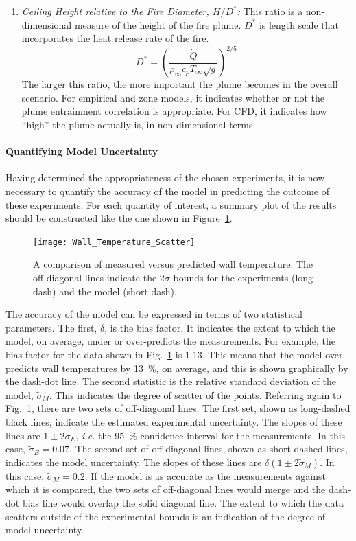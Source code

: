 \documentclass[graybox]{svmult}
\begin{document}
\begin{enumerate}
\item {\em Ceiling Height relative to the Fire Diameter, $H/D^*$:}
This ratio is a non-dimensional measure of the height of the fire plume.
$D^*$ is length scale that incorporates the heat release rate of the fire.
\begin{equation}
   D^* = \left( \frac{\dot{Q}}{\rho_\infty c_p T_\infty \sqrt{g}} \right)^{2/5} \label{Dstar}
\end{equation}
The larger this ratio, the more important the plume becomes in the overall scenario. For empirical and zone models, it indicates whether or not the plume entrainment
correlation is appropriate. For CFD, it indicates how ``high'' the plume actually is, in non-dimensional terms.
\end{enumerate}


\paragraph{Quantifying Model Uncertainty}

Having determined the appropriateness of the chosen experiments, it is now necessary to quantify the accuracy of the model in predicting the outcome of these experiments. For each quantity of interest, a summary plot of the results should be constructed like the one shown in Figure~\ref{scatterplot}.
\begin{figure}[ht]
\texttt{[image: Wall\_Temperature\_Scatter]}
\caption{A comparison of measured versus predicted wall temperature. The off-diagonal lines indicate the $2 \widetilde{\sigma}$ bounds for the experiments (long dash) and the model (short dash).}
\label{scatterplot}
\end{figure}
The accuracy of the model can be expressed in terms of two statistical parameters. The first, $\delta$, is the bias factor. It indicates the extent to which the model, on average, under or over-predicts the measurements. For example, the bias factor for the data shown in Fig.~\ref{scatterplot} is 1.13. This means that the model over-predicts wall temperatures by 13~\%, on average, and this is shown graphically by the dash-dot line. The second statistic is the relative standard deviation of the model, $\widetilde{\sigma}_M$. This indicates the degree of scatter of the points. Referring again to Fig.~\ref{scatterplot}, there are two sets of off-diagonal lines. The first set, shown as long-dashed black lines, indicate the estimated experimental uncertainty. The slopes of these lines are $1\pm 2 \widetilde{\sigma}_E$, {\em i.e.} the 95~\% confidence interval for the measurements. In this case, $\widetilde{\sigma}_E=0.07$. The second set of off-diagonal lines, shown as short-dashed lines, indicates the model uncertainty. The slopes of these lines are $\delta (1\pm 2 \widetilde{\sigma}_M)$. In this case, $\widetilde{\sigma}_M=0.2$. If the model is as accurate as the measurements against which it is compared, the two sets of off-diagonal lines would merge and the dash-dot bias line would overlap the solid diagonal line. The extent to which the data scatters outside of the experimental bounds is an indication of the degree of model uncertainty.
\end{document}
